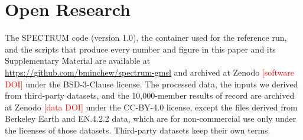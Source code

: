 \documentclass[draft,linenumbers]{agujournal2025}
\begin{document}



\section*{Open Research}
The SPECTRUM code (version 1.0), the container used for the reference run, and the scripts that produce every number and figure in this paper and its Supplementary Material are available at \url{https://github.com/bminchew/spectrum-gmsl} and archived at Zenodo \textcolor{red}{[software DOI]} under the BSD-3-Clause license. The processed data, the inputs we derived from third-party datasets, and the 10,000-member results of record are archived at Zenodo \textcolor{red}{[data DOI]} under the CC-BY-4.0 license, except the files derived from Berkeley Earth and EN.4.2.2 data, which are for non-commercial use only under the licenses of those datasets. Third-party datasets keep their own terms.
\end{document}
